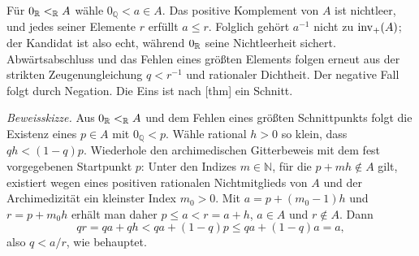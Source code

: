 \documentclass[main.tex]{subfiles}
\begin{document}
Für \(0_{\mathbb R}\mathrel{<_{\mathbb R}} A\) wähle \(0_{\mathbb Q}<a\in A\). Das positive
Komplement von \(A\) ist nichtleer, und jedes seiner Elemente \(r\) erfüllt
\(a\leq r\). Folglich gehört \(a^{-1}\) nicht zu \(\operatorname{inv}_{+}\!\left(A\right)\); der
Kandidat ist also echt, während \(0_{\mathbb R}\) seine Nichtleerheit sichert.
Abwärtsabschluss und das Fehlen eines größten Elements folgen erneut aus der
strikten Zeugenungleichung \(q<r^{-1}\) und rationaler Dichtheit. Der negative
Fall folgt durch Negation. Die Eins ist nach
[thm] ein Schnitt.


\emph{Beweisskizze.}
Aus \(0_{\mathbb R}\mathrel{<_{\mathbb R}} A\) und dem Fehlen eines größten Schnittpunkts folgt
die Existenz eines \(p\in A\) mit \(0_{\mathbb Q}<p\). Wähle rational
\(h>0\) so klein, dass \(qh<(1-q)p\). Wiederhole den archimedischen
Gitterbeweis mit dem fest vorgegebenen Startpunkt \(p\): Unter den Indizes
\(m\in\mathbb N\), für die \(p+mh\notin A\) gilt, existiert wegen eines
positiven rationalen Nichtmitglieds von \(A\) und der Archimedizität ein
kleinster Index \(m_0>0\). Mit
\(a=p+(m_0-1)h\) und \(r=p+m_0h\) erhält man daher
\(p\leq a<r=a+h\), \(a\in A\) und \(r\notin A\). Dann
\[
  qr=qa+qh<qa+(1-q)p\leq qa+(1-q)a=a,
\]
also \(q<a/r\), wie behauptet.

\end{document}
